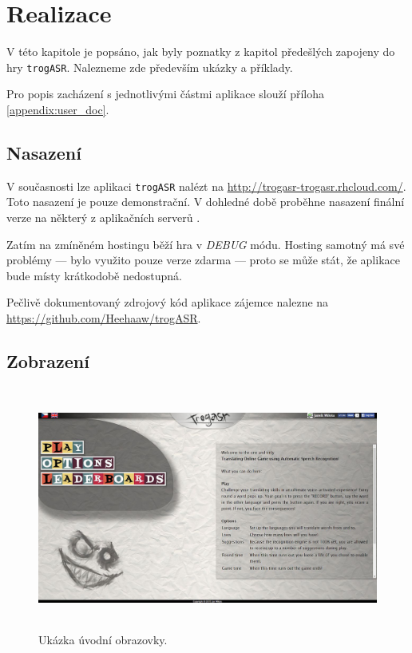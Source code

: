 \chapter{Realizace}

V této kapitole je popsáno, jak byly poznatky z kapitol předešlých zapojeny do hry \verb|trogASR|. Nalezneme zde především ukázky a příklady.

Pro popis zacházení s jednotlivými částmi aplikace slouží příloha \ref{appendix:user_doc}.

\section{Nasazení}

V současnosti lze aplikaci \verb|trogASR| nalézt na \url{http://trogasr-trogasr.rhcloud.com/}. Toto nasazení je pouze demonstrační. V dohledné době proběhne nasazení finální verze na některý z aplikačních serverů .

Zatím na zmíněném hostingu běží hra v {\sl DEBUG} módu. Hosting samotný má své problémy --- bylo využito pouze verze zdarma --- proto se může stát, že aplikace bude místy krátkodobě nedostupná.

Pečlivě dokumentovaný zdrojový kód aplikace zájemce nalezne na \url{https://github.com/Heehaaw/trogASR}.

\section{Zobrazení}

\begin{figure}[h]
	\centering
	\includegraphics[width=140mm,height=80mm]{img/title_screen.jpg}
	\caption{Ukázka úvodní obrazovky.}
	\label{fig:title}
\end{figure}

